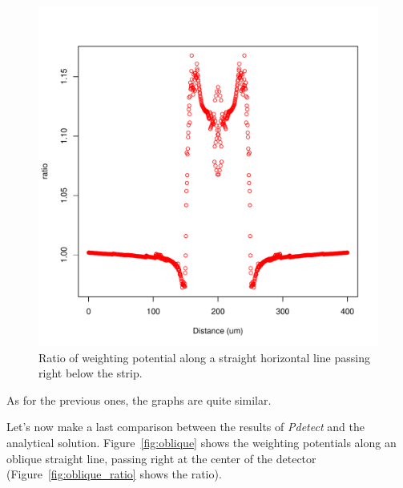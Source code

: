 \documentclass[11pt]{article}
\begin{document}
\begin{figure}[H]
\begin{minipage}[b]{.46\linewidth}
			\includegraphics[scale=0.5]{images/annexe/horizon-top_ratio.pdf}
			\caption{Ratio of weighting potential along a straight horizontal line passing right below
					the strip.}
			\label{fig:horizon_ratio}
		\end{minipage}
	\end{figure}

	As for the previous ones, the graphs are quite similar.

	Let's now make a last comparison between the results of \textit{Pdetect} and the analytical solution.
	Figure~\ref{fig:oblique} shows the weighting potentials along an oblique straight line, passing right at the
	center of the detector (Figure~\ref{fig:oblique_ratio} shows the ratio).
\end{document}
